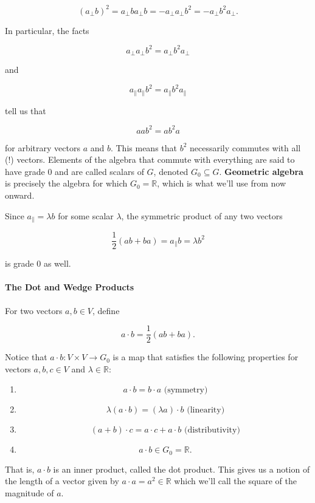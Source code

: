\documentclass{article}
\begin{document}
$$(a_\perp b)^2 = a_\perp b a_\perp b = -a_\perp a_\perp b^2 = - a_\perp b^2 a_\perp.$$

In particular, the facts

$$a_\perp a_\perp b^2 = a_\perp b^2 a_\perp$$

and

$$a_\parallel a_\parallel b^2 = a_\parallel b^2 a_\parallel$$

tell us that

$$aab^2 = ab^2 a$$

for arbitrary vectors $a$ and $b$. This means that $b^2$
necessarily commutes with all (!) vectors. Elements of the algebra that
commute with everything are said to have grade $0$ and are called
scalars of $G$, denoted $G_0 \subseteq G$. \textbf{Geometric
algebra} is precisely the algebra for which $G_0 = \mathbb{R}$, which is what we'll use from now onward.

Since $a_\parallel = \lambda b$ for some scalar $\lambda$, the
symmetric product of any two vectors

$$\frac{1}{2}(ab + ba) = a_\parallel b = \lambda b^2$$

is grade 0 as well.

\paragraph{The Dot and Wedge Products}\label{the-dot-and-wedge-products}

For two vectors $a,b \in V$, define

$$a \cdot b = \frac{1}{2}(ab + ba).$$

Notice that $a \cdot b : V \times V \to G_0$ is a map that satisfies the following properties for vectors $a, b, c \in V$ and $\lambda \in \mathbb{R}$:

\begin{enumerate}
\item $$a \cdot b = b \cdot a \text{ (symmetry)}$$
\item $$\lambda (a \cdot b) = (\lambda a) \cdot b \text{ (linearity)}$$
\item $$(a + b) \cdot c = a \cdot c + a \cdot b \text{ (distributivity)}$$
\item $$a \cdot b \in G_0 = \mathbb{R}.$$
\end{enumerate}

That is, $a \cdot b$ is an inner product, called the dot product. This
gives us a notion of the length of a vector given by
$a \cdot a = a^2 \in \mathbb{R}$ which we'll call the square of the
magnitude of $a$.
\end{document}
